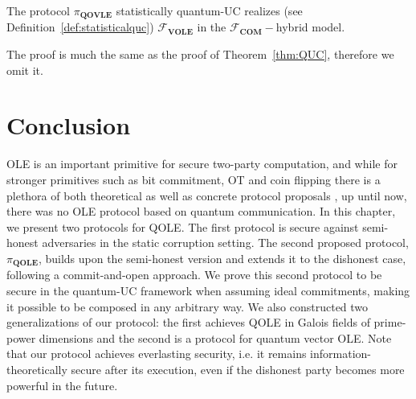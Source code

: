 \begin{theorem}

The protocol $\mathcal{\pi}_{\textbf{QOVLE}}$ statistically quantum-UC realizes  (see Definition~\ref{def:statisticalquc}) $\mathcal{F}_{\textbf{VOLE}}$ in the $\mathcal{F}_{\textbf{COM}}-$hybrid model.
\label{thm:QUC-VOLE}
\end{theorem}

The proof is much the same as the proof of Theorem~\ref{thm:QUC}, therefore we omit it.


\section{Conclusion} 

OLE is an important primitive for secure two-party computation, and while for stronger primitives such as bit commitment, OT  and coin flipping there is a plethora of both theoretical as well as concrete protocol proposals \cite{M05, MTVUZ05, BBBG09, BBBGST11, DV12, SG12, KWW12, NJCKW12, KC13, PJLCLTKD14, LAAPMP14, LAPPP16, ARW19, BCKD20,  SY20,  ARV21,  SMP22}, up until now, there was no OLE protocol based on quantum communication. In this chapter, we present two protocols for QOLE. The first protocol is secure against semi-honest adversaries in the static corruption setting. The second proposed protocol, $\pi_{\textbf{QOLE}}$, builds upon the semi-honest version and extends it to the dishonest case, following a commit-and-open approach. We prove this second protocol to be secure in the quantum-UC framework when assuming ideal commitments, making it possible to be composed in any arbitrary way. We also constructed two generalizations of our protocol: the first achieves QOLE in Galois fields of prime-power dimensions and the second is a protocol for quantum vector OLE.
 Note that our protocol achieves everlasting security, i.e. it remains information-theoretically secure after its execution, even if the dishonest party becomes more powerful in the future.

%
%
%
